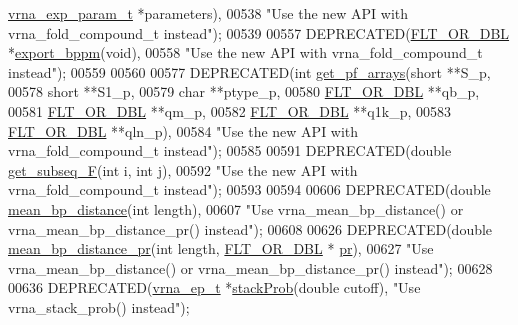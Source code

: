 \begin{DoxyCode}
      \hyperlink{group__energy__parameters_structvrna__exp__param__s}{vrna\_exp\_param\_t} *parameters),
00538 \textcolor{stringliteral}{"Use the new API with vrna\_fold\_compound\_t instead"});
00539 
00557 DEPRECATED(\hyperlink{group__data__structures_ga31125aeace516926bf7f251f759b6126}{FLT\_OR\_DBL}  *\hyperlink{group__part__func__global__deprecated_gac5ac7ee281aae1c5cc5898a841178073}{export\_bppm}(\textcolor{keywordtype}{void}),
00558 \textcolor{stringliteral}{"Use the new API with vrna\_fold\_compound\_t instead"});
00559 
00560 
00577 DEPRECATED(\textcolor{keywordtype}{int} \hyperlink{group__part__func__global__deprecated_ga42faebdfce6f070c5f89adfc8427525c}{get\_pf\_arrays}(\textcolor{keywordtype}{short} **S\_p,
00578                   \textcolor{keywordtype}{short} **S1\_p,
00579                   \textcolor{keywordtype}{char} **ptype\_p,
00580                   \hyperlink{group__data__structures_ga31125aeace516926bf7f251f759b6126}{FLT\_OR\_DBL} **qb\_p,
00581                   \hyperlink{group__data__structures_ga31125aeace516926bf7f251f759b6126}{FLT\_OR\_DBL} **qm\_p,
00582                   \hyperlink{group__data__structures_ga31125aeace516926bf7f251f759b6126}{FLT\_OR\_DBL} **q1k\_p,
00583                   \hyperlink{group__data__structures_ga31125aeace516926bf7f251f759b6126}{FLT\_OR\_DBL} **qln\_p),
00584 \textcolor{stringliteral}{"Use the new API with vrna\_fold\_compound\_t instead"});
00585 
00591 DEPRECATED(\textcolor{keywordtype}{double} \hyperlink{group__part__func__global__deprecated_ga189e2a1ec6cc32c53ea72f7543b0441e}{get\_subseq\_F}(\textcolor{keywordtype}{int} i, \textcolor{keywordtype}{int} j),
00592 \textcolor{stringliteral}{"Use the new API with vrna\_fold\_compound\_t instead"});
00593 
00594 
00606 DEPRECATED(\textcolor{keywordtype}{double}  \hyperlink{group__part__func__global__deprecated_ga79cbc375af65f11609feb6b055269e7d}{mean\_bp\_distance}(\textcolor{keywordtype}{int} length),
00607 \textcolor{stringliteral}{"Use vrna\_mean\_bp\_distance() or vrna\_mean\_bp\_distance\_pr() instead"});
00608 
00626 DEPRECATED(\textcolor{keywordtype}{double} \hyperlink{group__part__func__global__deprecated_gad5ba36cef8d01cf4244cc09b9bf1ce1d}{mean\_bp\_distance\_pr}(\textcolor{keywordtype}{int} length, \hyperlink{group__data__structures_ga31125aeace516926bf7f251f759b6126}{FLT\_OR\_DBL} *
      \hyperlink{fold__vars_8h_ac98ec419070aee6831b44e5c700f090f}{pr}),
00627 \textcolor{stringliteral}{"Use vrna\_mean\_bp\_distance() or vrna\_mean\_bp\_distance\_pr() instead"});
00628 
00636 DEPRECATED(\hyperlink{group__struct__utils__plist_structvrna__elem__prob__s}{vrna\_ep\_t} *\hyperlink{group__part__func__global__deprecated_ga8f18624bcd0b47d1a266d9e5527e5362}{stackProb}(\textcolor{keywordtype}{double} cutoff), \textcolor{stringliteral}{"Use vrna\_stack\_prob() instead"});

\end{DoxyCode}
